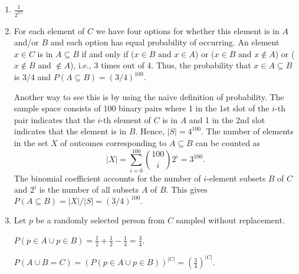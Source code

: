 \begin{enumerate}[label=(\alph*)]

    \item $\frac{1}{2^{|C|}}$

    \item For each element of $C$ we have four options for whether this element is in $A$ and/or $B$ and each option has equal probability of occurring.
          An element $x \in C$ is in $A \subseteq B$ if and only if ($x \in B \text{ and } x \in A$) or ($x \in B \text{ and } x \notin A$) or ($x \notin B \text{ and } \notin A$), i.e., 3 times out of 4.
          Thus, the probability that $x \in A \subseteq B$ is $3/4$ and $P(A \subseteq B) = (3/4)^{100}$.

          Another way to see this is by using the naive definition of probability.
          The sample space consists of 100 binary pairs where 1 in the 1st slot of the $i$-th pair indicates that the $i$-th element of $C$ is in $A$ and 1 in the 2nd slot indicates that the element is in $B$.
          Hence, $|S| = 4^{100}$.
          The number of elements in the set $X$ of outcomes corresponding to $A \subseteq B$ can be counted as
          $$|X| = \sum_{i=0}^{100} \binom{100}{i}2^i = 3^{100}.$$
          The binomial coefficient accounts for the number of $i$-element subsets $B$ of $C$ and $2^i$ is the number of all subsets $A$ of $B$.
          This gives $P(A \subseteq B) = |X| / |S| = (3/4)^{100}.$

    \item Let $p$ be a randomly selected person from $C$ sampled without
          replacement.

          $P(p \in A \cup p \in B) = \frac{1}{2} + \frac{1}{2} - \frac{1}{4} = \frac{3}
              {4}$.

          $P(A \cup B = C) = (P(p \in A \cup p \in B))^{|C|} = \left(\frac{3}{4}\right)^
              {|C|}.$
\end{enumerate}